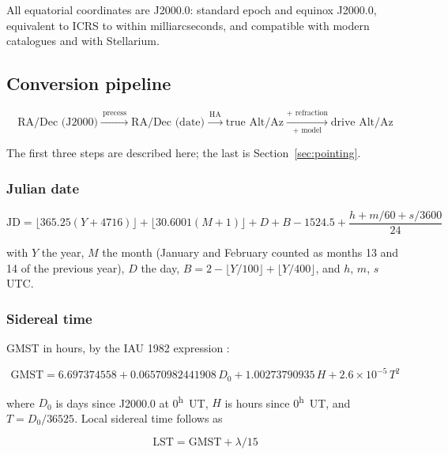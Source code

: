 \documentclass[11pt,a4paper]{article}
\begin{document}
All equatorial coordinates are J2000.0: standard epoch and equinox J2000.0, equivalent to ICRS to within milliarcseconds, and compatible with modern catalogues and with Stellarium.

\subsection{Conversion pipeline}

\begin{equation}
\text{RA/Dec (J2000)}
\xrightarrow{\ \text{precess}\ }
\text{RA/Dec (date)}
\xrightarrow{\ \text{HA}\ }
\text{true Alt/Az}
\xrightarrow[\text{+ model}]{\text{+ refraction}}
\text{drive Alt/Az}
\end{equation}

The first three steps are described here; the last is Section~\ref{sec:pointing}.

\subsubsection{Julian date}

\begin{equation}
\text{JD} = \lfloor 365.25(Y + 4716) \rfloor + \lfloor 30.6001(M + 1) \rfloor + D + B - 1524.5 + \frac{h + m/60 + s/3600}{24}
\end{equation}

with $Y$ the year, $M$ the month (January and February counted as months 13 and 14 of the previous year), $D$ the day, $B = 2 - \lfloor Y/100 \rfloor + \lfloor Y/400 \rfloor$, and $h$, $m$, $s$ UTC.

\subsubsection{Sidereal time}

GMST in hours, by the IAU 1982 expression \cite{aoki}:

\begin{equation}
\text{GMST} = 6.697374558 + 0.06570982441908\,D_0 + 1.00273790935\,H + 2.6\times10^{-5}\,T^2
\end{equation}

where $D_0$ is days since J2000.0 at 0\textsuperscript{h}~UT, $H$ is hours since 0\textsuperscript{h}~UT, and $T = D_0/36525$. Local sidereal time follows as

\begin{equation}
\text{LST} = \text{GMST} + \lambda/15
\end{equation}
\end{document}
